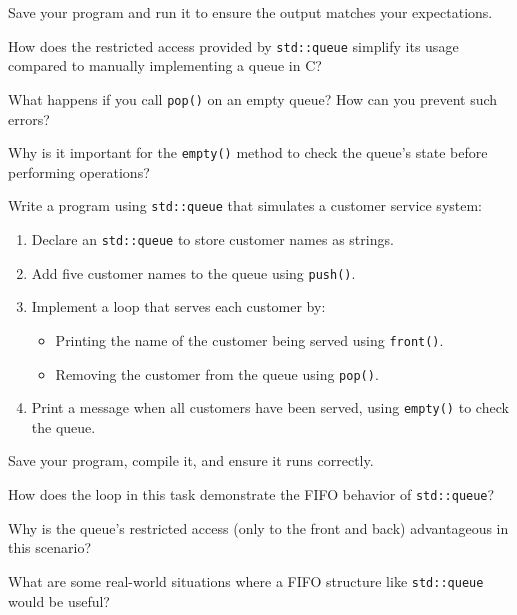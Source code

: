 \begin{challenge}
\begin{task}
        Save your program and run it to ensure the output matches your expectations.

        \begin{questions}
            \item How does the restricted access provided by \texttt{std::queue} simplify its usage compared to manually implementing a queue in C?
            \item What happens if you call \texttt{pop()} on an empty queue? How can you prevent such errors?
            \item Why is it important for the \texttt{empty()} method to check the queue’s state before performing operations?
        \end{questions}
    \end{task}

    \begin{task}
        Write a program using \texttt{std::queue} that simulates a customer service system:
        \begin{enumerate}
            \item Declare an \texttt{std::queue} to store customer names as strings.
            \item Add five customer names to the queue using \texttt{push()}.
            \item Implement a loop that serves each customer by:
                \begin{itemize}
                    \item Printing the name of the customer being served using \texttt{front()}.
                    \item Removing the customer from the queue using \texttt{pop()}.
                \end{itemize}
            \item Print a message when all customers have been served, using \texttt{empty()} to check the queue.
        \end{enumerate}

        Save your program, compile it, and ensure it runs correctly.

        \begin{questions}
            \item How does the loop in this task demonstrate the FIFO behavior of \texttt{std::queue}?
            \item Why is the queue’s restricted access (only to the front and back) advantageous in this scenario?
            \item What are some real-world situations where a FIFO structure like \texttt{std::queue} would be useful?
        \end{questions}
    \end{task}


\end{challenge}
